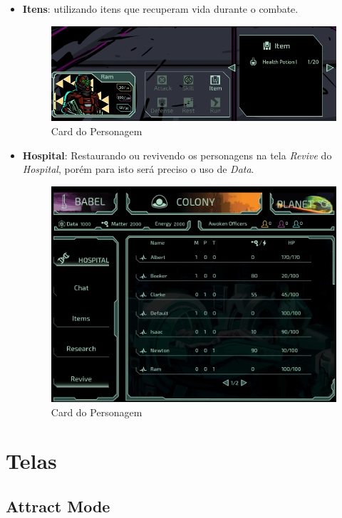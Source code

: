 \documentclass[11pt]{article} %
\begin{document}
\begin{itemize}
  \item \textbf{Itens}: utilizando itens que recuperam vida durante o combate.
    \begin{figure}[!htp]
    \centering
    \includegraphics[scale=0.35]{res/item_combat.png}
    \caption{Card do Personagem}
    \label{Card do Personagem}
    \end{figure}
  \item \textbf{Hospital}: Restaurando ou revivendo os personagens na tela \textit{Revive} do \textit{Hospital}, porém para isto será preciso o uso de \textit{Data}.
    \begin{figure}[!htp]
    \centering
    \includegraphics[scale=0.3]{res/revive.png}
    \caption{Card do Personagem}
    \label{Card do Personagem}
    \end{figure}
\end{itemize}

\section{Telas}

\subsection{Attract Mode}
\end{document}
